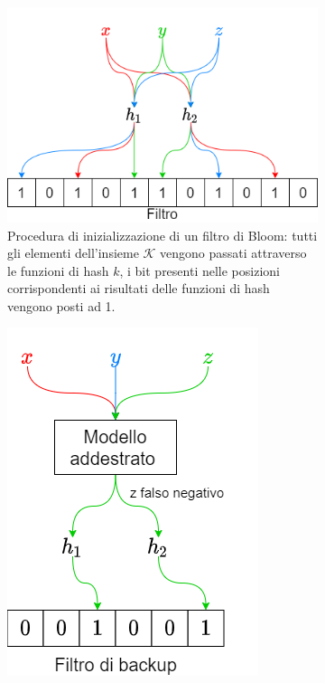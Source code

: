 \documentclass[../../main.tex]{subfiles}
\begin{document}
    \begin{figure}[H]
        \centering
        \begin{subfigure}[t]{0.65\textwidth}
            \includegraphics[width=\textwidth]{immagini/5_1/BFInizializzazione.png}
            \caption{Procedura di inizializzazione di un filtro di Bloom: tutti gli elementi dell'insieme $\mathcal{K}$ vengono passati attraverso le funzioni di hash $k$, i bit presenti nelle posizioni corrispondenti ai risultati delle funzioni di hash vengono posti ad 1.}
            \label{fig:BFInizializzazione}
        \end{subfigure}
        \begin{subfigure}[t]{0.34\textwidth}
            \includegraphics[width=\textwidth]{immagini/5_1/LBFInizializzazione.png}

\end{subfigure}
\end{figure}
\end{document}

